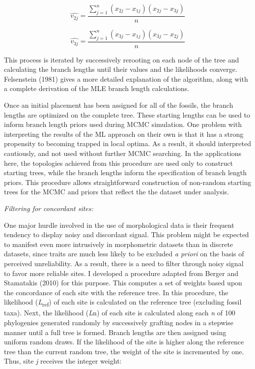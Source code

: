 \documentclass[12pt]{article}
\begin{document}
\begin{equation}
 \hat{v_{2j}} =   \frac{\sum\limits_{j=1}^{n}(x_{2j}- x_{1j}) (x_{2j} - x_{3j})}{n} 
\end{equation}

\begin{equation}
\hat{v_{3j}} =   \frac{\sum\limits_{j=1}^{n}(x_{3j}- x_{1j}) (x_{3j} - x_{2j})}{n}
\end{equation}


This process is iterated by successively rerooting on each node of the
tree and calculating the branch lengths until their values and the
likelihoods converge. Felsenstein (1981) gives a more detailed
explanation of the algorithm, along with a complete derivation of the MLE branch length calculations.

Once an initial placement has been assigned for  all of the fossils,
the branch lengths are optimized on the complete tree. These starting lengths can be used to inform branch
length priors used during MCMC simulation. One problem with interpreting
the results of the ML approach on their own is that it has a strong
propensity to becoming trapped in local optima. As a result, it should
interpreted cautiously, and not used without further MCMC searching. In the
applications here, the topologies achieved from this procedure are
used only to construct  starting trees, while the branch
lengths inform the specification of branch length priors. This procedure
allows straightforward construction of non-random starting trees for the
MCMC and priors that reflect the the dataset under analysis.

\emph{Filtering for concordant sites:}

One major hurdle involved in the use of morphological data is their
frequent tendency to display noisy and discordant signal. This problem
might be expected to manifest even more intrusively in morphometric
datasets than in discrete datasets, since traits are much less likely to
be excluded \emph{a priori} on the basis of perceived unreliability. As
a result, there is a need to filter through noisy signal to favor more
reliable sites. I developed a procedure adapted from Berger and
Stamatakis (2010) for this purpose. This computes a set of weights based
upon the concordance of each site with the reference tree. In this
procedure, the likelihood (\emph{L}\textsubscript{ref}) of each site is calculated on
the reference tree (excluding fossil taxa). Next, the likelihood
(\emph{L}n) of each site is calculated along each \emph{n} of 100
 phylogenies generated randomly by  successively grafting nodes in a stepwise manner
 until a full tree is formed. Branch lengths are then assigned using uniform random draws.
  If the likelihood of the site is higher along the reference tree than the current random tree, the weight of the
site is incremented by one. Thus, site \emph{j} receives the integer
weight:
\end{document}
